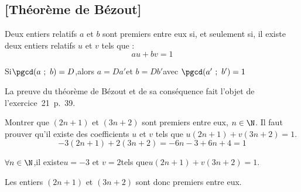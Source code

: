 \subsection{[Théorème de Bézout]{}}

\begin{theoreme}
  Deux entiers relatifs $a$ et $b$ sont premiers entre eux si, et
  seulement si, il existe deux entiers relatifs $u$ et $v$ tels que :
$$au+bv=1$$
\end{theoreme}

\begin{consequence}
  Si\enskip $\pgcd(a\ ;\ b)=D$,\enskip alors \enskip $a=Da'$\enskip et
  \enskip $b=Db'$\enskip avec \enskip $\pgcd(a'\ ;\ b')=1$
\end{consequence}

\begin{remarque}
  La preuve du théorème de Bézout et de sa conséquence fait l'objet de
  l'exercice~21~p.~39.
\end{remarque}


\begin{methode*1}
\exercice\label{methode-bezout}

Montrer que $(2n+1)$ et $(3n+2)$ sont premiers entre eux, $n\in\N$.
\correction Il faut prouver qu'il existe des coefficients $u$ et $v$
tels que $u(2n+1)+v(3n+2)=1$.
$$-3(2n+1)+2(3n+2)=-6n-3+6n+4=1$$

$\forall n\in\N$,\enskip il existe\enskip $u=-3$ \enskip et\enskip
$v=2$\enskip tels que\enskip $u(2n+1)+v(3n+2)=1$.\medskip

Les entiers $(2n+1)$ et $(3n+2)$ sont donc premiers entre eux.
\end{methode*1}


